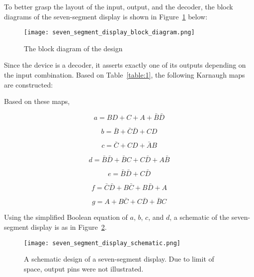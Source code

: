 \documentclass[12pt]{article}
\begin{document}
To better grasp the layout of the input, output, and the decoder, the block diagrams of the seven-segment display is shown in Figure~\ref{figure:3} below:

\begin{figure}[h]
  \centering
  \texttt{[image: seven\_segment\_display\_block\_diagram.png]}
  \caption{The block diagram of the design}
  \label{figure:3}
\end{figure}

Since the device is a decoder, it asserts exactly one of its outputs depending on the input combination. Based on Table~\ref{table:1}, the following Karnaugh maps are constructed:



Based on these maps,

\begin{equation} \label{equation:1}
  a = BD + C + A + \bar{B}\bar{D}
\end{equation}

\begin{equation} \label{equation:2}
  b = \bar{B} + \bar{C}\bar{D} + CD
\end{equation}

\begin{equation} \label{equation:3}
  c = \bar{C} + CD + \bar{A}B
\end{equation}

\begin{equation} \label{equation:4}
  d = \bar{B}\bar{D} + \bar{B}C + C\bar{D} + A\bar{B}
\end{equation}

\begin{equation} \label{equation:5}
  e = \bar{B}\bar{D} + C\bar{D}
\end{equation}

\begin{equation} \label{equation:6}
  f = \bar{C}\bar{D} + B\bar{C} + B\bar{D} + A
\end{equation}

\begin{equation} \label{equation:7}
  g = A + B\bar{C} + C\bar{D} + \bar{B}C
\end{equation}

Using the simplified Boolean equation of $a$, $b$, $c$, and $d$, a schematic of the seven-segment display is as in Figure~\ref{figure:4}.

\begin{figure}
  \centering
  \texttt{[image: seven\_segment\_display\_schematic.png]}
  \caption{A schematic design of a seven-segment display. Due to limit of space, output pins were not illustrated.}
  \label{figure:4}
\end{figure}
\end{document}
